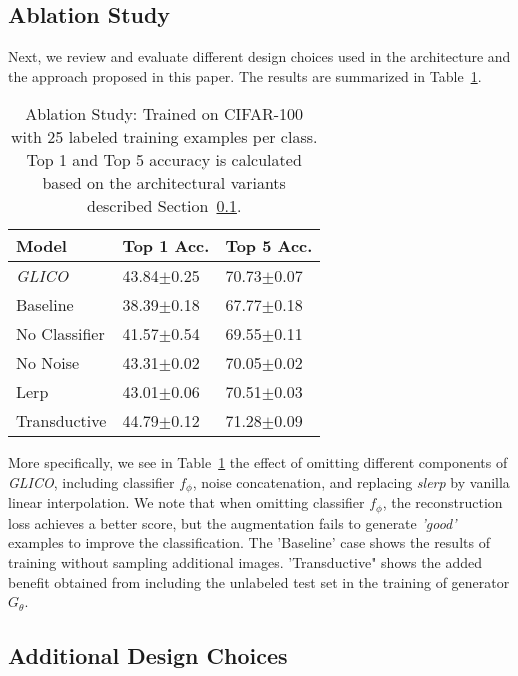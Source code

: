 \documentclass[a4paper,conference]{IEEEtran}
\begin{document}
\subsection{Ablation Study}
\label{sec: ablation}

Next, we review and evaluate different design choices used in the architecture and the approach proposed in this paper. The results are summarized in Table~\ref{tab:ablation-study}.

\begin{table}[htbp]
	\centering
	\caption{Ablation Study: Trained on CIFAR-100 with 25 labeled training examples per class. Top 1 and Top 5 accuracy is calculated based on the architectural variants described Section~\ref{sec: ablation}. 	\label{tab:ablation-study}}
	\begin{tabular}{l|ll}
		Model          & Top 1 Acc.     & Top 5 Acc.     \\
		\toprule
		\textit{GLICO} & 43.84$\pm$0.25 & 70.73$\pm$0.07 \\
		Baseline       & 38.39$\pm$0.18 & 67.77$\pm$0.18 \\
		No Classifier  & 41.57$\pm$0.54 & 69.55$\pm$0.11 \\
		No Noise      & 43.31$\pm$0.02 & 70.05$\pm$0.02 \\
		Lerp           & 43.01$\pm$0.06 & 70.51$\pm$0.03 \\
		Transductive   & 44.79$\pm$0.12 & 71.28$\pm$0.09 \\
		\bottomrule
	\end{tabular}
\end{table}


More specifically, we see in Table~\ref{tab:ablation-study} the effect of omitting different components of \textit{GLICO}, including classifier $f_\phi$, noise concatenation, and replacing \emph{slerp} by vanilla linear interpolation. We note that when omitting classifier $f_\phi$, the reconstruction loss achieves a better score, but the augmentation fails to generate \textit{'good'} examples to improve the classification. The 'Baseline' case shows the results of training without sampling additional images. 'Transductive" shows the added benefit obtained from including the unlabeled test set in the training of generator $G_\theta$. 

		
\subsection{Additional Design Choices}
\end{document}
